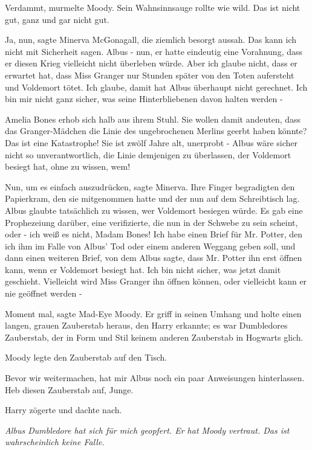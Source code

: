 \glqq{}Verdammt\grqq{}, murmelte Moody. Sein Wahnsinnsauge rollte wie wild. \glqq{}
Das ist nicht gut, ganz und gar nicht gut.\grqq{}

\glqq{}Ja, nun\grqq{}, sagte Minerva McGonagall, die ziemlich besorgt aussah.
\glqq{}Das kann ich nicht mit Sicherheit sagen. Albus - nun, er hatte eindeutig
eine Vorahnung, dass er diesen Krieg vielleicht nicht überleben würde. Aber ich
glaube nicht, dass er erwartet hat, dass Miss Granger nur Stunden später von den
Toten aufersteht und Voldemort tötet. Ich glaube, damit hat Albus überhaupt
nicht gerechnet. Ich bin mir nicht ganz sicher, was seine Hinterbliebenen davon
halten werden -\grqq{}

Amelia Bones erhob sich halb aus ihrem Stuhl. \glqq{}Sie wollen damit andeuten,
dass das Granger-Mädchen die Linie des ungebrochenen Merlins geerbt haben
könnte? Das ist eine Katastrophe! Sie ist zwölf Jahre alt, unerprobt - Albus
wäre sicher nicht so unverantwortlich, die Linie demjenigen zu überlassen, der
Voldemort besiegt hat, ohne zu wissen, wem!\grqq{}

\glqq{}Nun, um es einfach auszudrücken\grqq{}, sagte Minerva. Ihre Finger
begradigten den Papierkram, den sie mitgenommen hatte und der nun auf dem
Schreibtisch lag. \glqq{}Albus glaubte tatsächlich zu wissen, wer Voldemort
besiegen würde. Es gab eine Prophezeiung darüber, eine verifizierte, die nun in
der Schwebe zu sein scheint, oder - ich weiß es nicht, Madam Bones! Ich habe
einen Brief für Mr. Potter, den ich ihm im Falle von Albus' Tod oder einem
anderen Weggang geben soll, und dann einen weiteren Brief, von dem Albus sagte,
dass Mr. Potter ihn erst öffnen kann, wenn er Voldemort besiegt hat. Ich bin
nicht sicher, was jetzt damit geschieht. Vielleicht wird Miss Granger ihn öffnen
können, oder vielleicht kann er nie geöffnet werden -\grqq{}

\glqq{}Moment mal\grqq{}, sagte Mad-Eye Moody. Er griff in seinen Umhang und
holte einen langen, grauen Zauberstab heraus, den Harry erkannte; es war
Dumbledores Zauberstab, der in Form und Stil keinem anderen Zauberstab in
Hogwarts glich.

Moody legte den Zauberstab auf den Tisch.

\glqq{}Bevor wir weitermachen, hat mir Albus noch ein paar Anweisungen
hinterlassen. Heb diesen Zauberstab auf, Junge.\grqq{}

Harry zögerte und dachte nach.

\emph{Albus Dumbledore hat sich für mich geopfert. Er hat Moody vertraut. Das
ist wahrscheinlich keine Falle.}

